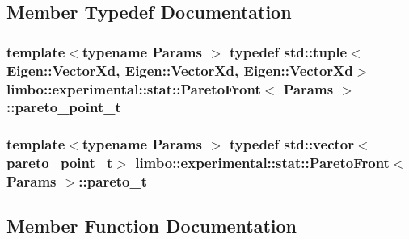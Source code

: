 \subsection{Member Typedef Documentation}
\hypertarget{structlimbo_1_1experimental_1_1stat_1_1_pareto_front_a07a9d1b38b8c942ec0666841ec310ed8}{}
\subsubsection[{pareto\+\_\+point\+\_\+t}]{\setlength{\rightskip}{0pt plus 5cm}template$<$typename Params $>$ typedef std\+::tuple$<$Eigen\+::\+Vector\+Xd, Eigen\+::\+Vector\+Xd, Eigen\+::\+Vector\+Xd$>$ {\bf limbo\+::experimental\+::stat\+::\+Pareto\+Front}$<$ Params $>$\+::{\bf pareto\+\_\+point\+\_\+t}}\label{structlimbo_1_1experimental_1_1stat_1_1_pareto_front_a07a9d1b38b8c942ec0666841ec310ed8}
\hypertarget{structlimbo_1_1experimental_1_1stat_1_1_pareto_front_ad43dd449215fa8e506851c3f7fc96940}{}
\subsubsection[{pareto\+\_\+t}]{\setlength{\rightskip}{0pt plus 5cm}template$<$typename Params $>$ typedef std\+::vector$<${\bf pareto\+\_\+point\+\_\+t}$>$ {\bf limbo\+::experimental\+::stat\+::\+Pareto\+Front}$<$ Params $>$\+::{\bf pareto\+\_\+t}}\label{structlimbo_1_1experimental_1_1stat_1_1_pareto_front_ad43dd449215fa8e506851c3f7fc96940}


\subsection{Member Function Documentation}
\hypertarget{structlimbo_1_1experimental_1_1stat_1_1_pareto_front_a341b34d96290a874818bbdb4f27f9f2b}{}
